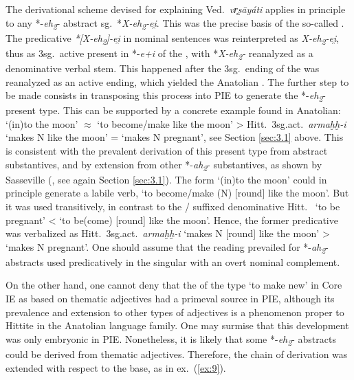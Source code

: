 \documentclass[output=paper,colorlinks,citecolor=brown]{langscibook}
\begin{document}
The derivational scheme devised for explaining Ved.\  \textit{vr̥ṣāyáti}  applies in principle to any *-\textit{eh\textsubscript{2}}- abstract  sg.\ *\textit{X-eh\textsubscript{2}-ei̯}.  This was the precise basis of the so-called . The predicative \textit{*[X-eh\textsubscript{2}]-ei̯} in nominal sentences was reinterpreted as  \textit{X-eh\textsubscript{2}-ei̯}, thus as 3sg.\ active present in *-\textit{e+i} of the , with *\textit{X-eh\textsubscript{2}-} reanalyzed as a denominative verbal stem. This happened after the 3sg.\ ending of the  was reanalyzed as an active ending, which yielded the Anatolian . The further step to be made consists in transposing this process into PIE to generate the *-\textit{eh\textsubscript{2}}- present type. This can be supported by a concrete example found in Anatolian:   ‘(in)to the moon’ {$\approx$} ‘to become/make like the moon’ > Hitt.\ 3sg.act.\ \textit{armaḫḫ-i}  ‘makes N like the moon’ = ‘makes N pregnant’, see Section \ref{sec:3.1} above. This is consistent with the prevalent derivation of this  present type from abstract substantives, and by extension from other *-\textit{ah\textsubscript{2}}- substantives, as shown by Sasseville (\citeyear{Sasseville2021}, see again Section  \ref{sec:3.1}). The form  ‘(in)to the moon’ could in principle generate a labile verb, ‘to become/make (N) [round] like the moon’. But it was used transitively, in contrast to the / suffixed denominative Hitt.\  ‘to be pregnant’ <  ‘to be(come) [round] like the moon’. Hence, the former predicative was verbalized as Hitt.\ 3sg.act.\ \textit{armaḫḫ-i}  ‘makes N [round] like the moon’ > ‘makes N pregnant’.  One should assume that the  reading prevailed for *-\textit{ah\textsubscript{2}}-abstracts used predicatively in the  singular with an overt nominal complement.  

On the other hand, one cannot deny that the  of the type  ‘to make new’ in Core IE as based on thematic adjectives had a primeval source in PIE, although its prevalence and extension to other types of adjectives is a phenomenon proper to Hittite in the Anatolian language family. One may surmise that this development was only embryonic in PIE. Nonetheless, it is likely that some *-\textit{eh\textsubscript{2}}- abstracts could be derived from thematic adjectives. Therefore, the chain of derivation was extended with respect to the base, as in ex.\ (\ref{ex:9}).  
\end{document}
